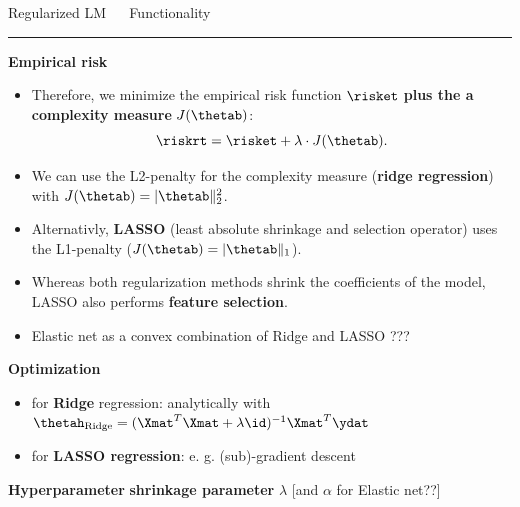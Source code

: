 \documentclass[11pt,compress,t,notes=noshow, xcolor=table]{beamer}
\begin{document}
\LARGE
\begin{frame}{\textcolor{gray!80}{Regularized LM} ~~ Functionality}
\normalsize
\vspace{-0.5cm}
\noindent \textcolor{gray!80}{\rule{\textwidth}{1pt}}

\vspace{0.3cm}




\footnotesize

\textbf{\textcolor{gray!80}{Empirical risk}}

\begin{itemize}

\item Therefore, we minimize the empirical risk function $\risket$ \textbf{plus the a complexity measure} $J(\thetab)$:
  $$
  \riskrt = \risket + \lambda \cdot J(\thetab). 
  $$ 
  
\item We can use the L2-penalty for the complexity measure (\textbf{ridge regression}) with $J(\thetab) = |\thetab\|_2^2 $. 

\item Alternativly, \textbf{LASSO} (least absolute shrinkage and selection operator) uses the L1-penalty ($J(\thetab) = |\thetab\|_1 $).

\item Whereas both regularization methods shrink the coefficients of the model, LASSO also performs \textbf{feature selection}. 

\item Elastic net as a convex combination of Ridge and LASSO ???
  
  
\end{itemize}





\medskip

\textbf{\textcolor{gray!80}{Optimization}} ~~
\begin{itemize}\footnotesize
  \item for \textbf{Ridge} regression: analytically with $\thetah_{\text{Ridge}} = (\Xmat^T \Xmat  + \lambda \id)^{-1} \Xmat^T\ydat$
  \item for \textbf{LASSO regression}: e. g. (sub)-gradient descent
\end{itemize}

\medskip

\textbf{\textcolor{gray!80}{Hyperparameter}} \textbf{shrinkage parameter} $\lambda$ [and $\alpha$ for Elastic net??]

\end{frame}
\end{document}

